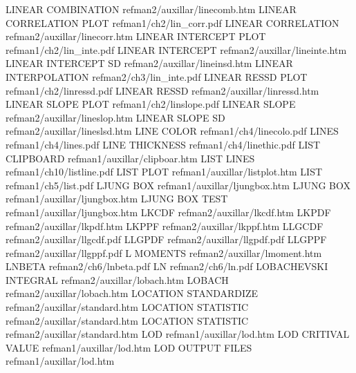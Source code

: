 LINEAR COMBINATION                      refman2/auxillar/linecomb.htm
LINEAR CORRELATION PLOT                 refman1/ch2/lin_corr.pdf
LINEAR CORRELATION                      refman2/auxillar/linecorr.htm
LINEAR INTERCEPT PLOT                   refman1/ch2/lin_inte.pdf
LINEAR INTERCEPT                        refman2/auxillar/lineinte.htm
LINEAR INTERCEPT SD                     refman2/auxillar/lineinsd.htm
LINEAR INTERPOLATION                    refman2/ch3/lin_inte.pdf
LINEAR RESSD PLOT                       refman1/ch2/linressd.pdf
LINEAR RESSD                            refman2/auxillar/linressd.htm
LINEAR SLOPE PLOT                       refman1/ch2/linslope.pdf
LINEAR SLOPE                            refman2/auxillar/lineslop.htm
LINEAR SLOPE SD                         refman2/auxillar/lineslsd.htm
LINE COLOR                              refman1/ch4/linecolo.pdf
LINES                                   refman1/ch4/lines.pdf
LINE THICKNESS                          refman1/ch4/linethic.pdf
LIST CLIPBOARD                          refman1/auxillar/clipboar.htm
LIST LINES                              refman1/ch10/listline.pdf
LIST PLOT                               refman1/auxillar/listplot.htm
LIST                                    refman1/ch5/list.pdf
LJUNG BOX                               refman1/auxillar/ljungbox.htm
LJUNG BOX                               refman1/auxillar/ljungbox.htm
LJUNG BOX TEST                          refman1/auxillar/ljungbox.htm
LKCDF                                   refman2/auxillar/lkcdf.htm
LKPDF                                   refman2/auxillar/lkpdf.htm
LKPPF                                   refman2/auxillar/lkppf.htm
LLGCDF                                  refman2/auxillar/llgcdf.pdf
LLGPDF                                  refman2/auxillar/llgpdf.pdf
LLGPPF                                  refman2/auxillar/llgppf.pdf
L MOMENTS                               refman2/auxillar/lmoment.htm
LNBETA                                  refman2/ch6/lnbeta.pdf
LN                                      refman2/ch6/ln.pdf
LOBACHEVSKI INTEGRAL                    refman2/auxillar/lobach.htm
LOBACH                                  refman2/auxillar/lobach.htm
LOCATION STANDARDIZE                    refman2/auxillar/standard.htm
LOCATION STATISTIC                      refman2/auxillar/standard.htm
LOCATION STATISTIC                      refman2/auxillar/standard.htm
LOD                                     refman1/auxillar/lod.htm
LOD CRITIVAL VALUE                      refman1/auxillar/lod.htm
LOD OUTPUT FILES                        refman1/auxillar/lod.htm
